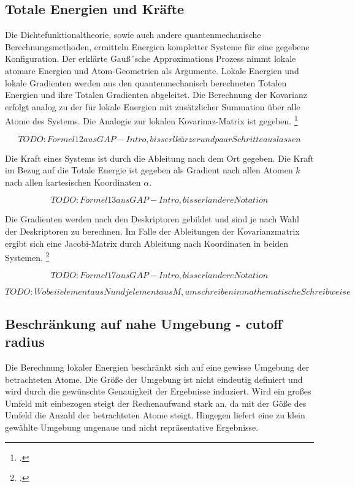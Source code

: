 \subsection{Totale Energien und Kräfte}

Die Dichtefunktionaltheorie, sowie auch andere quantenmechanische Berechnungsmethoden, ermitteln Energien kompletter Systeme für eine gegebene Konfiguration. Der erklärte Gauß´sche Approximations Prozess nimmt lokale atomare Energien und Atom-Geometrien als Argumente. Lokale Energien und lokale Gradienten werden aus den quantenmechanisch berechneten Totalen Energien und ihre Totalen Gradienten abgeleitet. Die Berechnung der Kovarianz erfolgt analog zu der für lokale Energien mit zusätzlicher Summation über alle Atome des Systems. Die Analogie zur lokalen Kovarinaz-Matrix ist gegeben. \footcite[1053]{GAP-intro}


$$TODO: Formel 12 aus GAP-Intro, bisserl kürzer und paar Schritte auslassen $$

Die Kraft eines Systems ist durch die Ableitung nach dem Ort gegeben. Die Kraft im Bezug auf die Totale Energie ist gegeben als Gradient nach allen Atomen $k$ nach allen kartesischen Koordinaten $\alpha$. 

$$TODO: Formel 13 aus GAP-Intro, bisserl andere Notation$$

Die Gradienten werden nach den Deskriptoren gebildet und sind je nach Wahl der Deskriptoren zu berechnen. Im Falle der Ableitungen der Kovarianzmatrix ergibt sich eine Jacobi-Matrix durch Ableitung nach Koordinaten in beiden Systemen. \footcite[1053]{GAP-intro}


$$TODO: Formel 17 aus GAP-Intro, bisserl andere Notation$$

$$TODO: Wobei i element aus N und j element aus M, umschreiben in mathematische Schreibweise$$






\subsection{Beschränkung auf nahe Umgebung - cutoff radius}

Die Berechnung lokaler Energien beschränkt sich auf eine gewisse Umgebung der betrachteten Atome. Die Größe der Umgebung ist nicht eindeutig definiert und wird durch die gewünschte Genauigkeit der Ergebnisse induziert. Wird ein großes Umfeld mit einbezogen steigt der Rechenaufwand stark an, da mit der Göße des Umfeld die Anzahl der betrachteten Atome steigt. Hingegen liefert eine zu klein gewählte Umgebung ungenaue und nicht repräsentative Ergebnisse. 

